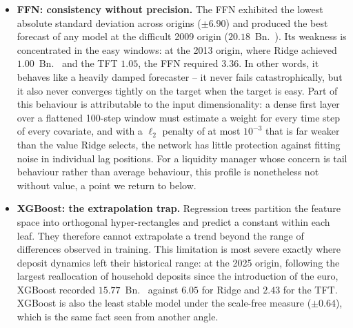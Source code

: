 \documentclass[11pt,a4paper]{article}
\begin{document}
\begin{itemize}
    \item \textbf{FFN: consistency without precision.} The FFN exhibited the
    lowest absolute standard deviation across origins ($\pm 6.90$) and
    produced the best forecast of any model at the difficult 2009 origin
    ($20.18$~Bn.~\texteuro). Its weakness is concentrated in the easy windows:
    at the 2013 origin, where Ridge achieved $1.00$~Bn.~\texteuro{} and the
    TFT $1.05$, the FFN required $3.36$. In other words, it behaves like a
    heavily damped forecaster -- it never fails catastrophically, but it also
    never converges tightly on the target when the target is easy. Part of
    this behaviour is attributable to the input dimensionality: a dense first
    layer over a flattened 100-step window must estimate a weight for every
    time step of every covariate, and with a $\ell_2$ penalty of at most
    $10^{-3}$ that is far weaker than the value Ridge selects, the network has
    little protection against fitting noise in individual lag positions. For a
    liquidity manager whose concern is tail behaviour rather than average
    behaviour, this profile is nonetheless not without value, a point we
    return to below.
    \item \textbf{XGBoost: the extrapolation trap.} Regression trees partition
    the feature space into orthogonal hyper-rectangles and predict a constant
    within each leaf. They therefore cannot extrapolate a trend beyond the
    range of differences observed in training. This limitation is most severe
    exactly where deposit dynamics left their historical range: at the 2025
    origin, following the largest reallocation of household deposits since the
    introduction of the euro, XGBoost recorded $15.77$~Bn.~\texteuro{} against
    $6.05$ for Ridge and $2.43$ for the TFT. XGBoost is also the least stable
    model under the scale-free measure ($\pm 0.64$), which is the same fact
    seen from another angle.
\end{itemize}
\end{document}
